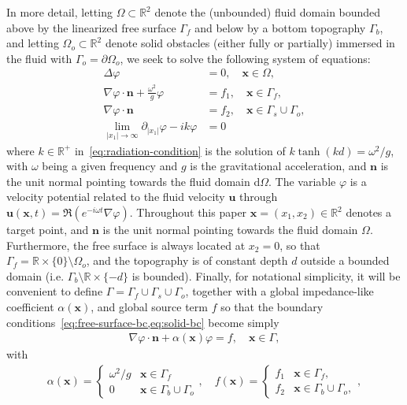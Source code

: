 \documentclass[11pt]{article}
\newcommand{\R}{\mathbb{R}}
\newcommand{\bn}{\mathbf{n}}
\newcommand{\bx}{\mathbf{x}}
\begin{document}
In more detail, letting $\Omega \subset \mathbb{R}^2$ denote the (unbounded)
fluid domain bounded above by the linearized free surface $\Gamma_f$ and below
by a bottom topography $\Gamma_b$, and letting $\Omega_o \subset \mathbb{R}^2$
denote solid obstacles (either fully or partially) immersed in the fluid with
$\Gamma_o = \partial \Omega_o$, we seek to solve the following system of equations:
%
\begin{subequations}
  \label{eq:water-waves-system}
  \begin{align}  
    \label{eq:laplace-equation}
    \Delta \varphi &=0, \quad \bx \in \Omega,\\
    \label{eq:free-surface-bc}
    \nabla \varphi \cdot \bn + \frac{\omega^2}{g}\varphi &=f_1, \quad \bx \in \Gamma_f,\\
    \label{eq:solid-bc}  
    \nabla \varphi \cdot \bn &=f_2, \quad \bx \in \Gamma_s \cup \Gamma_o,\\
    \label{eq:radiation-condition}  
    \lim_{|x_1| \to \infty} \partial_{|x_1|} \varphi - i k \varphi  &= 0
  \end{align}
\end{subequations}
%
where $k \in \mathbb{R}^+$ in~\cref{eq:radiation-condition} is the solution of
$k\tanh(kd) = \omega^2/g$, with $\omega$ being a given frequency and $g$ is the
gravitational acceleration, and $\bn$ is the unit normal pointing towards the
fluid domain d$\Omega$. The variable $\varphi$ is a velocity potential related to
the fluid velocity $\boldsymbol{u}$ through $\boldsymbol{u}(\bx,t) = \Re
\left(e^{-i\omega t} \nabla \varphi \right)$.  Throughout this paper $\bx =
(x_1,x_2) \in \R^2$ denotes a target point, and $\bn$ is the unit normal
pointing towards the fluid domain $\Omega$. Furthermore, the free surface is
always located at $x_2 = 0$, so that $\Gamma_f = \R \times \{0\} \setminus
\Omega_o$, and the topography is of constant depth $d$ outside a bounded domain
(i.e. $\Gamma_b \setminus \R \times \{-d\}$ is bounded). Finally, for notational
simplicity, it will be convenient to define $\Gamma = \Gamma_f \cup \Gamma_s
\cup \Gamma_o$, together with a global impedance-like coefficient $\alpha(\bx)$,
and global source term $f$ so that the boundary
conditions~\cref{eq:free-surface-bc,eq:solid-bc} become simply
%
\begin{align}
  \label{eq:global-bc}  
  \nabla \varphi \cdot \bn + \alpha(\bx) \varphi = f, \quad \bx \in \Gamma,
\end{align}
%
with
%
\begin{align}
  \label{eq:global-defs}  
  \alpha(\bx) = \begin{cases}
    \omega^2/g  &\bx \in \Gamma_f\\
    0   &\bx \in \Gamma_b \cup \Gamma_o
  \end{cases}, \quad
  f(\bx) = \begin{cases}
    f_1  &\bx \in \Gamma_f,\\
    f_2  &\bx \in \Gamma_b \cup \Gamma_o,
  \end{cases}, 
\end{align}
% 
\end{document}
